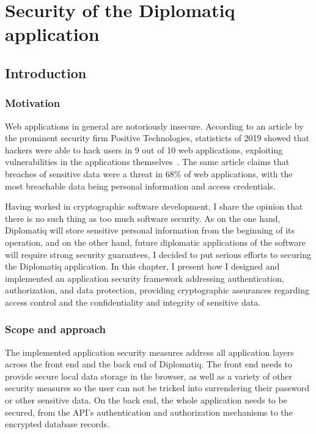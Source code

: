 \chapter{Security of the Diplomatiq application}
\label{chapter:security}

\section{Introduction}

\subsection{Motivation}

Web applications in general are notoriously insecure. According to an article by the prominent security firm Positive Technologies, statisticts of 2019 showed that hackers were able to hack users in 9 out of 10 web applications, exploiting vulnerabilities in the applications themselves~\cite{ptsecurity-2019}. The same article claims that breaches of sensitive data were a threat in 68\% of web applications, with the most breachable data being personal information and access credentials.

Having worked in cryptographic software development, I share the opinion that there is no such thing as too much software security. As on the one hand, Diplomatiq will store sensitive personal information from the beginning of its operation, and on the other hand, future diplomatic applications of the software will require strong security guarantees, I decided to put serious efforts to securing the Diplomatiq application. In this chapter, I present how I designed and implemented an application security framework addressing authentication, authorization, and data protection, providing cryptographic assurances regarding access control and the confidentiality and integrity of sensitive data.

\subsection{Scope and approach}

The implemented application security measures address all application layers across the front end and the back end of Diplomatiq. The front end needs to provide secure local data storage in the browser, as well as a variety of other security measures so the user can not be tricked into surrendering their password or other sensitive data. On the back end, the whole application needs to be secured, from the API's authentication and authorization mechanisms to the encrypted database records.


